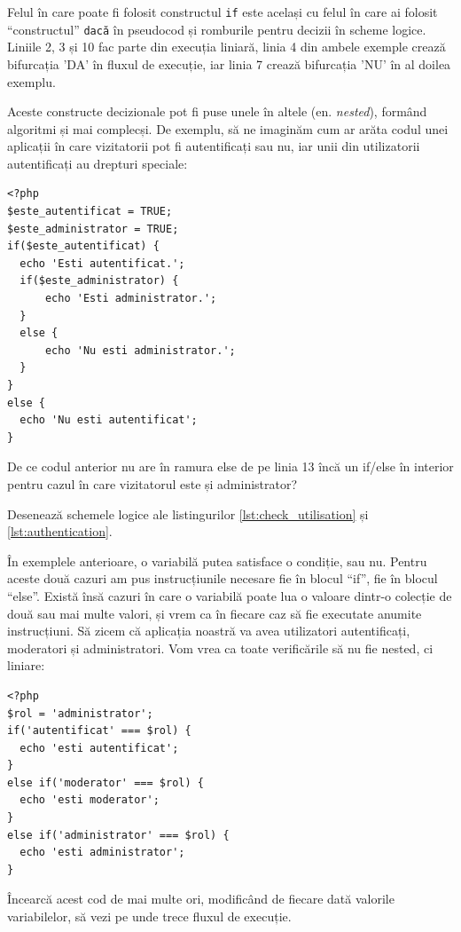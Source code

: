 Felul în care poate fi folosit constructul \texttt{if} este același cu felul în
care ai folosit ``constructul'' \texttt{dacă} în pseudocod și romburile pentru
decizii în scheme logice. Liniile 2, 3 și 10 fac parte din execuția liniară,
linia 4 din ambele exemple crează bifurcația 'DA' în fluxul de execuție,
iar linia 7 crează bifurcația 'NU' în al doilea exemplu.


Aceste constructe decizionale pot fi puse unele în altele (en. \textsl{nested}),
formând algoritmi și mai complecși. De exemplu, să ne imaginăm cum
ar arăta codul unei aplicații în care vizitatorii pot fi autentificați
sau nu, iar unii din utilizatorii autentificați au drepturi speciale:
\begin{lstlisting}[caption={Autentificare}, label=lst:authentication]
<?php
$este_autentificat = TRUE;
$este_administrator = TRUE;
if($este_autentificat) {
  echo 'Esti autentificat.';
  if($este_administrator) {
	  echo 'Esti administrator.';
  }
  else {
	  echo 'Nu esti administrator.';
  }
}
else {
  echo 'Nu esti autentificat';
}
\end{lstlisting}

\begin{Exercise}[title={Întrebare de inteligență},difficulty=1]
De ce codul anterior nu are în ramura else de pe linia 13 încă
un if/else în interior pentru cazul în care vizitatorul este
și administrator?
\end{Exercise}


\begin{Exercise}[title={Schemă logică pornind de la cod PHP},difficulty=1]
Desenează schemele logice ale listingurilor 
\ref{lst:check_utilisation} și \ref{lst:authentication}.
\end{Exercise}

În exemplele anterioare, o variabilă putea satisface o condiție, sau nu.
Pentru aceste două cazuri am pus instrucțiunile necesare fie în blocul
``if'', fie în blocul ``else''.
Există însă cazuri în care o variabilă poate lua o valoare dintr-o colecție de
două sau mai multe valori, și vrem ca în fiecare caz să fie
executate anumite instrucțiuni. Să zicem că aplicația noastră
va avea utilizatori autentificați, moderatori și administratori.
Vom vrea ca toate verificările să nu fie nested, ci liniare:
\begin{lstlisting}
<?php
$rol = 'administrator';
if('autentificat' === $rol) {
  echo 'esti autentificat';
}
else if('moderator' === $rol) {
  echo 'esti moderator';
}
else if('administrator' === $rol) {
  echo 'esti administrator';
}
\end{lstlisting}
Încearcă acest cod de mai multe ori, modificând de fiecare dată valorile
variabilelor, să vezi pe unde trece fluxul de execuție.

